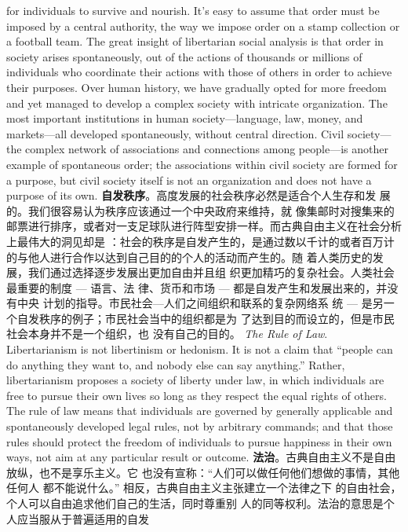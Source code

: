 \begin{paracol}{2}
for individuals to survive and nourish. It's easy to assume that
order must be imposed by a central authority, the way we impose order on a stamp collection or a football team. The great
insight of libertarian social analysis is that order in society arises
spontaneously, out of the actions of thousands or millions of individuals who coordinate their actions with those of others in
order to achieve their purposes. Over human history, we have
gradually opted for more freedom and yet managed to develop
a complex society with intricate organization. The most important institutions in human society---language, law, money, and
markets---all developed spontaneously, without central direction. Civil society---the complex network of associations and
connections among people---is another example of spontaneous
order; the associations within civil society are formed for a purpose, but civil society itself is not an organization and does not
have a purpose of its own.
\switchcolumn
\textbf{自发秩序}。高度发展的社会秩序必然是适合个人生存和发
展的。我们很容易认为秩序应该通过一个中央政府来维持，就
像集邮时对搜集来的邮票进行排序，或者对一支足球队进行阵型安排一样。而古典自由主义在社会分析上最伟大的洞见却是 ：社会的秩序是自发产生的，是通过数以千计的或者百万计
的与他人进行合作以达到自己目的的个人的活动而产生的。随
着人类历史的发展，我们通过选择逐步发展出更加自由并且组
织更加精巧的复杂社会。人类社会最重要的制度 --- 语言、法
律、货币和市场 --- 都是自发产生和发展出来的，并没有中央
计划的指导。市民社会---人们之间组织和联系的复杂网络系
统 --- 是另一个自发秩序的例子；市民社会当中的组织都是为
了达到目的而设立的，但是市民社会本身并不是一个组织，也
没有自己的目的。
\switchcolumn*
\textit{The Rule of Law}. Libertarianism is not libertinism or hedonism.
It is not a claim that ``people can do anything they want to, and
nobody else can say anything.'' Rather, libertarianism proposes
a society of liberty under law, in which individuals are free to
pursue their own lives so long as they respect the equal rights of
others. The rule of law means that individuals are governed by
generally applicable and spontaneously developed legal rules,
not by arbitrary commands; and that those rules should protect
the freedom of individuals to pursue happiness in their own
ways, not aim at any particular result or outcome.
\switchcolumn
\textbf{法治}。古典自由主义不是自由放纵，也不是享乐主义。它
也没有宣称：“人们可以做任何他们想做的事情，其他任何人
都不能说什么。” 相反，古典自由主义主张建立一个法律之下
的自由社会，个人可以自由追求他们自己的生活，同时尊重别
人的同等权利。法治的意思是个人应当服从于普遍适用的自发

\end{paracol}
